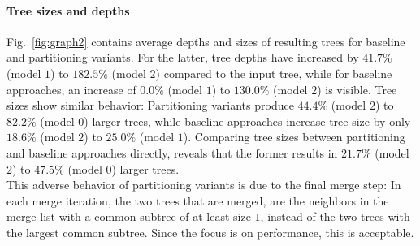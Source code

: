 \paragraph{Tree sizes and depths}  
Fig.~\ref{fig:graph2} contains average depths and sizes of resulting trees for baseline and partitioning variants.
For the latter, tree depths have increased by $41.7\%$ (model $1$) to $182.5\%$ (model $2$) compared to the input tree, while for baseline approaches, an increase of $0.0\%$ (model $1$) to $130.0\%$ (model $2$) is visible.
Tree sizes show similar behavior:
Partitioning variants produce $44.4\%$ (model $2$) to $82.2\%$ (model $0$) larger trees, while baseline approaches increase tree size by only $18.6\%$ (model $2$) to $25.0\%$ (model $1$).
Comparing tree sizes between partitioning and baseline approaches directly, reveals that the former results in $21.7\%$ (model $2$) to $47.5\%$ (model $0$) larger trees.
\\
This adverse behavior of partitioning variants is due to the final merge step:
In each merge iteration, 
the two trees that are merged, are the neighbors in the merge list with a common subtree of at least size $1$, 
instead of the two trees with the largest common subtree. 
Since the focus is on performance, this is acceptable.
